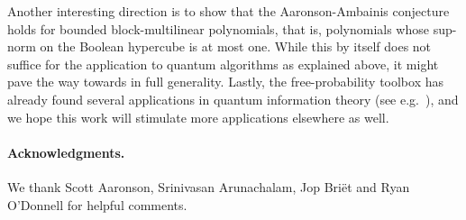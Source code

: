 Another interesting direction is to show that the Aaronson-Ambainis conjecture holds for bounded block-multilinear polynomials, that is, polynomials whose sup-norm on the Boolean hypercube is at most one. While this by itself does not suffice for the application to quantum algorithms as explained above, it might pave the way towards  in full generality. Lastly, the free-probability toolbox has already found several applications in quantum information theory (see e.g.~\cite{Yin:freeprob,CollinsNechita}), and we hope this work will stimulate more applications elsewhere as well.


\paragraph{Acknowledgments.} We thank Scott Aaronson, Srinivasan Arunachalam, Jop Bri\"et and Ryan O'Donnell for helpful comments.
